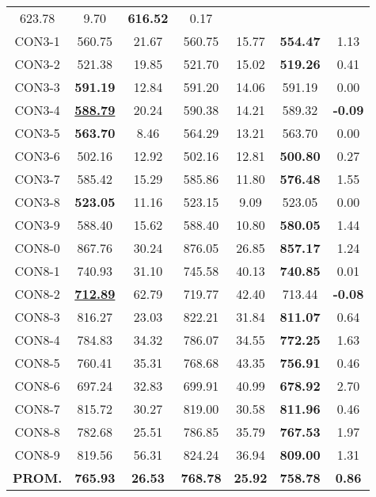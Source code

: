 \begin{table}[ht]
\begin{tabular}{c c c c c c c}
623.78 & 9.70 & \bf{616.52} & 
0.17\\CON3-1 & 560.75 & 21.67 & 
560.75 & 15.77 & \bf{554.47} & 
1.13\\CON3-2 & 521.38 & 19.85 & 
521.70 & 15.02 & \bf{519.26} & 
0.41\\CON3-3 & \bf{591.19} & 12.84 & 
591.20 & 14.06 & 591.19 & 0.00\\
CON3-4 & \bf{\underline{588.79}} & 20.24 & 
590.38 & 14.21 & 589.32 & 
\bf{-0.09}\\CON3-5 & \bf{563.70} & 8.46 & 
564.29 & 13.21 & 563.70 & 0.00\\
CON3-6 & 502.16 & 12.92 & 
502.16 & 12.81 & \bf{500.80} & 
0.27\\CON3-7 & 585.42 & 15.29 & 
585.86 & 11.80 & \bf{576.48} & 
1.55\\CON3-8 & \bf{523.05} & 11.16 & 
523.15 & 9.09 & 523.05 & 0.00\\
CON3-9 & 588.40 & 15.62 & 
588.40 & 10.80 & \bf{580.05} & 
1.44\\CON8-0 & 867.76 & 30.24 & 
876.05 & 26.85 & \bf{857.17} & 
1.24\\CON8-1 & 740.93 & 31.10 & 
745.58 & 40.13 & \bf{740.85} & 
0.01\\CON8-2 & \bf{\underline{712.89}} & 62.79 & 
719.77 & 42.40 & 713.44 & 
\bf{-0.08}\\CON8-3 & 816.27 & 23.03 & 
822.21 & 31.84 & \bf{811.07} & 
0.64\\CON8-4 & 784.83 & 34.32 & 
786.07 & 34.55 & \bf{772.25} & 
1.63\\CON8-5 & 760.41 & 35.31 & 
768.68 & 43.35 & \bf{756.91} & 
0.46\\CON8-6 & 697.24 & 32.83 & 
699.91 & 40.99 & \bf{678.92} & 
2.70\\CON8-7 & 815.72 & 30.27 & 
819.00 & 30.58 & \bf{811.96} & 
0.46\\CON8-8 & 782.68 & 25.51 & 
786.85 & 35.79 & \bf{767.53} & 
1.97\\CON8-9 & 819.56 & 56.31 & 
824.24 & 36.94 & \bf{809.00} & 
1.31\\\bf{PROM.} & 
\bf{765.93} & \bf{26.53} & \bf{768.78} & \bf{25.92} & \bf{758.78} & \bf{0.86}\\[1ex]\hline
\end{tabular}
\label{table:nonlin}
\end{table} \clearpage
